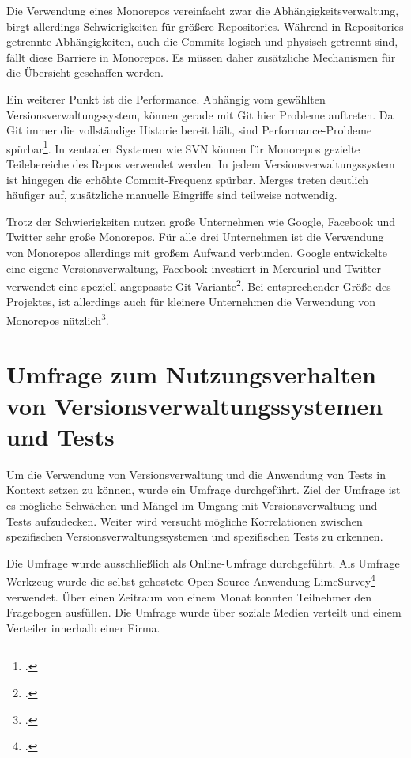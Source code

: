 Die Verwendung eines Monorepos vereinfacht zwar die Abhängigkeitsverwaltung, birgt allerdings Schwierigkeiten für größere Repositories. Während in Repositories getrennte Abhängigkeiten, auch die Commits logisch und physisch getrennt sind, fällt diese Barriere in Monorepos. Es müssen daher zusätzliche Mechanismen für die Übersicht geschaffen werden.

Ein weiterer Punkt ist die Performance. Abhängig vom gewählten Versionsverwaltungssystem, können gerade mit Git hier Probleme auftreten. Da Git immer die vollständige Historie bereit hält, sind Performance-Probleme spürbar\footcite{atlassian-monorepo-git}. In zentralen Systemen wie SVN können für Monorepos gezielte Teilebereiche des Repos verwendet werden. 
In jedem Versionsverwaltungssystem ist hingegen die erhöhte Commit-Frequenz spürbar. Merges treten deutlich häufiger auf, zusätzliche manuelle Eingriffe sind teilweise notwendig.

Trotz der Schwierigkeiten nutzen große Unternehmen wie Google, Facebook und Twitter sehr große Monorepos. Für alle drei Unternehmen ist die Verwendung von Monorepos allerdings mit großem Aufwand verbunden. Google entwickelte eine eigene Versionsverwaltung, Facebook investiert in Mercurial und Twitter verwendet eine speziell angepasste Git-Variante\footcite{monorepos-wild}.
Bei entsprechender Größe des Projektes, ist allerdings auch für kleinere Unternehmen die Verwendung von Monorepos nützlich\footcite{hackernoon-positive-monorepo}.

\section{Umfrage zum Nutzungsverhalten von Versionsverwaltungssystemen und Tests}

Um die Verwendung von Versionsverwaltung und die Anwendung von Tests in Kontext setzen zu können, wurde ein Umfrage durchgeführt.
Ziel der Umfrage ist es mögliche Schwächen und Mängel im Umgang mit Versionsverwaltung und Tests aufzudecken. Weiter wird versucht mögliche Korrelationen zwischen spezifischen Versionsverwaltungssystemen und spezifischen Tests zu erkennen.

Die Umfrage wurde ausschließlich als Online-Umfrage durchgeführt. Als Umfrage Werkzeug wurde die selbst gehostete Open-Source-Anwendung \glqq LimeSurvey\grqq{}\footcite[][]{limesurvey} verwendet. Über einen Zeitraum von einem Monat konnten Teilnehmer den Fragebogen ausfüllen. Die Umfrage wurde über soziale Medien verteilt und einem Verteiler innerhalb einer Firma.

